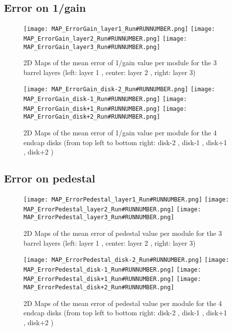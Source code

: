 \documentclass[a4paper,10pt]{article}
\begin{document}
\pagebreak



\subsection{Error on 1/gain}

\begin{figure}[htp]
 \centering
\subfigure
 {\texttt{[image: MAP\_ErrorGain\_layer1\_Run\#RUNNUMBER.png]}}
\subfigure
 {\texttt{[image: MAP\_ErrorGain\_layer2\_Run\#RUNNUMBER.png]}}
\subfigure
 {\texttt{[image: MAP\_ErrorGain\_layer3\_Run\#RUNNUMBER.png]}}
\caption{2D Maps of the mean error of 1/gain value per module for the 3 barrel layers (left: layer 1 , center: layer 2 , right: layer 3)}
\end{figure}

\begin{figure}[htp]
 \centering
\subfigure
 {\texttt{[image: MAP\_ErrorGain\_disk-2\_Run\#RUNNUMBER.png]}}
\subfigure
 {\texttt{[image: MAP\_ErrorGain\_disk-1\_Run\#RUNNUMBER.png]}}
\subfigure
 {\texttt{[image: MAP\_ErrorGain\_disk+1\_Run\#RUNNUMBER.png]}}
\subfigure
 {\texttt{[image: MAP\_ErrorGain\_disk+2\_Run\#RUNNUMBER.png]}}
\caption{2D Maps of the mean error of 1/gain value per module for the 4 endcap disks (from top left to bottom right: disk-2 , disk-1 , disk+1 , disk+2 )}
\end{figure}

\pagebreak



\subsection{Error on pedestal}

\begin{figure}[htp]
 \centering
\subfigure
 {\texttt{[image: MAP\_ErrorPedestal\_layer1\_Run\#RUNNUMBER.png]}}
\subfigure
 {\texttt{[image: MAP\_ErrorPedestal\_layer2\_Run\#RUNNUMBER.png]}}
\subfigure
 {\texttt{[image: MAP\_ErrorPedestal\_layer3\_Run\#RUNNUMBER.png]}}
\caption{2D Maps of the mean error of pedestal value per module for the 3 barrel layers (left: layer 1 , center: layer 2 , right: layer 3)}
\end{figure}

\begin{figure}[htp]
 \centering
\subfigure
 {\texttt{[image: MAP\_ErrorPedestal\_disk-2\_Run\#RUNNUMBER.png]}}
\subfigure
 {\texttt{[image: MAP\_ErrorPedestal\_disk-1\_Run\#RUNNUMBER.png]}}
\subfigure
 {\texttt{[image: MAP\_ErrorPedestal\_disk+1\_Run\#RUNNUMBER.png]}}
\subfigure
 {\texttt{[image: MAP\_ErrorPedestal\_disk+2\_Run\#RUNNUMBER.png]}}
\caption{2D Maps of the mean error of pedestal value per module for the 4 endcap disks (from top left to bottom right: disk-2 , disk-1 , disk+1 , disk+2 )}
\end{figure}
\end{document}
